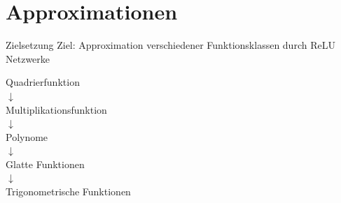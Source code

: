 \documentclass[10pt,aspectratio=169]{beamer}
\theoremstyle{plain} %
\theoremstyle{remark} %
\begin{document}
\section{Approximationen}

\begin{frame}{Zielsetzung}
    Ziel: Approximation verschiedener Funktionsklassen durch ReLU Netzwerke

    \begin{center}
        Quadrierfunktion \\ \pause
        \(\downarrow\) \\
        Multiplikationsfunktion \\ \pause
        \(\downarrow\) \\
        Polynome \\ \pause
        \(\downarrow\) \\
        Glatte Funktionen \\ \pause
        \(\downarrow\) \\
        Trigonometrische Funktionen
    \end{center}
\end{frame}
\end{document}
